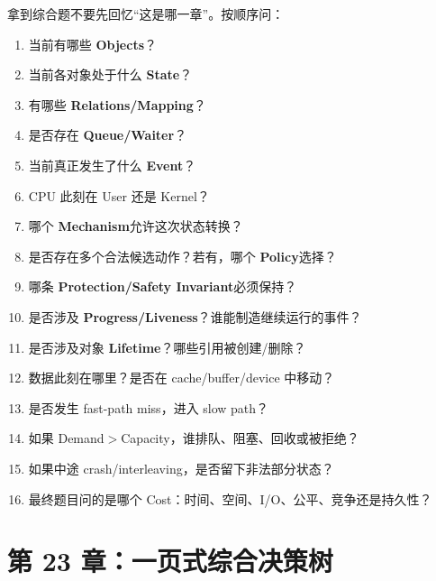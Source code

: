 \documentclass[11pt,a4paper]{ctexart}
\newcommand{\kw}[1]{\textbf{#1}}
\begin{document}
拿到综合题不要先回忆“这是哪一章”。按顺序问：
\begin{enumerate}
  \item 当前有哪些 \kw{Objects}？
  \item 当前各对象处于什么 \kw{State}？
  \item 有哪些 \kw{Relations/Mapping}？
  \item 是否存在 \kw{Queue/Waiter}？
  \item 当前真正发生了什么 \kw{Event}？
  \item CPU 此刻在 User 还是 Kernel？
  \item 哪个 \kw{Mechanism}允许这次状态转换？
  \item 是否存在多个合法候选动作？若有，哪个 \kw{Policy}选择？
  \item 哪条 \kw{Protection/Safety Invariant}必须保持？
  \item 是否涉及 \kw{Progress/Liveness}？谁能制造继续运行的事件？
  \item 是否涉及对象 \kw{Lifetime}？哪些引用被创建/删除？
  \item 数据此刻在哪里？是否在 cache/buffer/device 中移动？
  \item 是否发生 fast-path miss，进入 slow path？
  \item 如果 Demand$>$Capacity，谁排队、阻塞、回收或被拒绝？
  \item 如果中途 crash/interleaving，是否留下非法部分状态？
  \item 最终题目问的是哪个 Cost：时间、空间、I/O、公平、竞争还是持久性？
\end{enumerate}

\section{第 23 章：一页式综合决策树}
\end{document}
